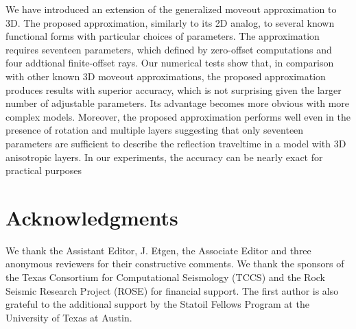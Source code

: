 We have introduced an extension of the generalized moveout approximation to 3D. The proposed approximation, similarly to its 2D analog,  to several known functional forms with particular choices of parameters. The approximation requires seventeen parameters, which  defined by zero-offset computations and four addtional finite-offset rays. Our numerical tests show that, in comparison with other known 3D moveout approximations, the proposed approximation produces results with superior accuracy, which is not surprising given the larger number of adjustable parameters. Its advantage becomes more obvious with more complex models. Moreover, the proposed approximation performs well even in the presence of  rotation and multiple layers suggesting that only seventeen parameters are sufficient to describe the reflection traveltime in a model with 3D anisotropic layers. In our experiments, the accuracy can be nearly exact for practical purposes 

\section{Acknowledgments}
We thank the Assistant Editor, J. Etgen, the Associate Editor and three anonymous reviewers for their constructive comments.
We thank the sponsors of the Texas Consortium for Computational Seismology (TCCS) and the Rock Seismic Research Project (ROSE) for financial support. The first author is also grateful to the additional support by the Statoil Fellows Program at the University of Texas at Austin. 

\appendix
